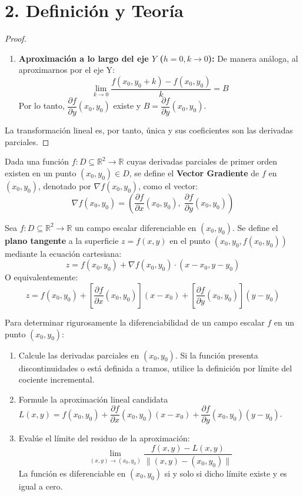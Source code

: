 \documentclass[11pt]{article}
\newenvironment{teoria}{%
  \section*{2. Definición y Teoría}%
}{}
\newenvironment{definicion}[1]{%
  \begin{tcolorbox}[colback=blue!5,colframe=blue!75!black,title=Definición: #1]%
}{%
  \end{tcolorbox}%
}
\newenvironment{procesamiento}[1]{%
  \begin{tcolorbox}[colback=gray!5,colframe=gray!60!black,title=Procedimiento: #1]%
}{%
  \end{tcolorbox}%
}
\begin{document}
\begin{teoria}
\begin{proof}
\begin{enumerate}
      \item \textbf{Aproximación a lo largo del eje $Y$ ($h = 0, k \to 0$):}
      De manera análoga, al aproximarnos por el eje Y:
      $$ \lim\limits_{k \to 0} \dfrac{f(x_0, y_0+k) - f(x_0, y_0)}{k} = B $$
      Por lo tanto, $\dfrac{\partial f}{\partial y}(x_0, y_0)$ existe y $B = \dfrac{\partial f}{\partial y}(x_0, y_0)$.
    \end{enumerate}
    La transformación lineal es, por tanto, única y sus coeficientes son las derivadas parciales.
  \end{proof}

  \begin{definicion}{Vector Gradiente}
    Dada una función $f \colon D \subseteq \mathbb{R}^2 \to \mathbb{R}$ cuyas derivadas parciales de primer orden existen en un punto $(x_0, y_0) \in D$, se define el \textbf{Vector Gradiente} de $f$ en $(x_0, y_0)$, denotado por $\nabla f(x_0, y_0)$, como el vector:
    $$ \nabla f(x_0, y_0) = \left( \dfrac{\partial f}{\partial x}(x_0, y_0), \; \dfrac{\partial f}{\partial y}(x_0, y_0) \right) $$
  \end{definicion}

  \begin{definicion}{Plano Tangente}
    Sea $f \colon D \subseteq \mathbb{R}^2 \to \mathbb{R}$ un campo escalar diferenciable en $(x_0, y_0)$. Se define el \textbf{plano tangente} a la superficie $z = f(x,y)$ en el punto $(x_0, y_0, f(x_0, y_0))$ mediante la ecuación cartesiana:
    $$ z = f(x_0, y_0) + \nabla f(x_0, y_0) \cdot (x - x_0, y - y_0) $$
    O equivalentemente:
    $$ z = f(x_0, y_0) + \left[ \dfrac{\partial f}{\partial x}(x_0, y_0) \right] (x - x_0) + \left[ \dfrac{\partial f}{\partial y}(x_0, y_0) \right] (y - y_0) $$
  \end{definicion}

  \begin{procesamiento}{Procedimiento Analítico para Verificar Diferenciabilidad}
    Para determinar rigurosamente la diferenciabilidad de un campo escalar $f$ en un punto $(x_0, y_0)$:
    \begin{enumerate}
      \item Calcule las derivadas parciales en $(x_0, y_0)$. Si la función presenta discontinuidades o está definida a tramos, utilice la definición por límite del cociente incremental.
      \item Formule la aproximación lineal candidata $L(x,y) = f(x_0, y_0) + \dfrac{\partial f}{\partial x}(x_0, y_0)(x-x_0) + \dfrac{\partial f}{\partial y}(x_0, y_0)(y-y_0)$.
      \item Evalúe el límite del residuo de la aproximación:
      $$ \lim\limits_{(x,y) \to (x_0, y_0)} \dfrac{f(x,y) - L(x,y)}{\| (x,y) - (x_0, y_0) \|} $$
      La función es diferenciable en $(x_0, y_0)$ si y solo si dicho límite existe y es igual a cero.
    \end{enumerate}
  \end{procesamiento}

\end{teoria}
\end{document}
